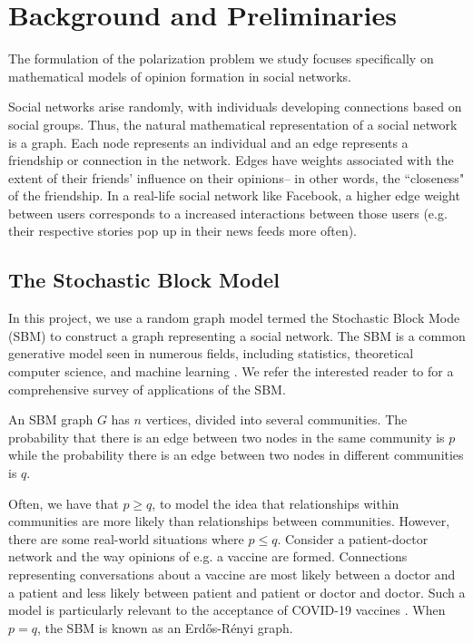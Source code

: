 
\section{Background and Preliminaries}
The formulation of the polarization problem we study focuses specifically on mathematical models of opinion formation in social networks. 

Social networks arise randomly, with individuals developing connections based on social groups. Thus, the natural mathematical representation of a social network is a graph. Each node represents an individual and an edge represents a friendship or connection in the network. Edges have weights associated with the extent of their friends' influence on their opinions-- in other words, the ``closeness" of the friendship. In a real-life social network like Facebook, a higher edge weight between users corresponds to a increased interactions between those users (e.g. their respective stories pop up in their news feeds more often). 

\subsection{The Stochastic Block Model}

In this project, we use a random graph model termed the Stochastic Block Mode (SBM) to construct a graph representing a social network. The SBM is a common generative model seen in numerous fields, including statistics, theoretical computer science, and machine learning \cite{sbm}. We refer the interested reader to \cite{sbm} for a comprehensive survey of applications of the SBM. 

An SBM graph $G$ has $n$ vertices, divided into several communities.
The probability that there is an edge between two nodes in the same community
is $p$ while the probability there is an edge between two nodes
in different communities is $q$.

Often, we have that $p \geq q$, to model the idea that relationships
within communities are more likely than relationships between
communities.
However, there are some real-world situations where $p \leq q$.
Consider a patient-doctor network and the way opinions of
e.g. a vaccine are formed.
Connections representing conversations about a vaccine
are most likely between a doctor and a patient and less
likely between patient and patient or doctor and doctor.
Such a model is particularly relevant to
the acceptance of COVID-19 vaccines \cite{hoff2020patient-doctor}. When $p=q$, the SBM is known as an Erdős-Rényi graph.

